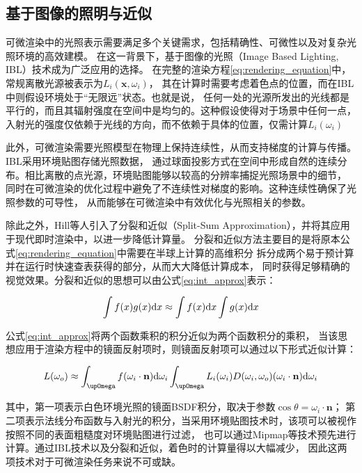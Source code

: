 \subsection{基于图像的照明与近似}
可微渲染中的光照表示需要满足多个关键需求，包括精确性、可微性以及对复杂光照环境的高效建模。
在这一背景下，基于图像的光照（Image Based Lighting, IBL）技术成为广泛应用的选择。
在完整的渲染方程\eqref{eq:rendering_equation}中，常规离散光源被表示为$L_i(\mathbf{x},\omega_i)$，
其在计算时需要考虑着色点的位置，而在IBL中则假设环境处于“无限远”状态。也就是说，
任何一处的光源所发出的光线都是平行的，而且其辐射强度在空间中是均匀的。这种假设使得对于场景中任何一点，
入射光的强度仅依赖于光线的方向，而不依赖于具体的位置，仅需计算$L_i(\omega_i)$

此外，可微渲染需要光照模型在物理上保持连续性，从而支持梯度的计算与传播。IBL采用环境贴图存储光照数据，
通过球面投影方式在空间中形成自然的连续分布。相比离散的点光源，环境贴图能够以较高的分辨率捕捉光照场景中的细节，
同时在可微渲染的优化过程中避免了不连续性对梯度的影响。这种连续性确保了光照参数的可导性，
从而能够在可微渲染中有效优化与光照相关的参数。

除此之外，Hill等人\cite{Hill_2014}引入了分裂和近似（Split-Sum Approximation），并将其应用于现代即时渲染中，以进一步降低计算量。
分裂和近似方法主要目的是将原本公式\eqref{eq:rendering_equation}中需要在半球上计算的高维积分
拆分成两个易于预计算并在运行时快速查表获得的部分，从而大大降低计算成本，
同时获得足够精确的视觉效果。分裂和近似的思想可以由公式\eqref{eq:int_approx}表示：

\begin{equation}
  \int f(x)g(x){\rm{d}}x\approx \int{f(x){\rm{d}}x} \int{g(x){\rm{d}}x}
  \label{eq:int_approx}
\end{equation}

公式\eqref{eq:int_approx}将两个函数乘积的积分近似为两个函数积分的乘积，
当该思想应用于渲染方程中的镜面反射项时，则镜面反射项可以通过以下形式近似计算：

\begin{equation}
  L(\omega_o)\approx 
  \int_{\upOmega}{f(\omega_i\cdot{\bf{n}}){\rm{d}}\omega_i}
  \int_{\upOmega}{L_i(\omega_i)D(\omega_i,\omega_o)(\omega_i\cdot{\bf{n}}){\rm{d}}\omega_i}
  \label{eq:L_omega_o_approx}
\end{equation}

其中，第一项表示白色环境光照的镜面BSDF积分，取决于参数$\cos{\theta}=\omega_i\cdot{\mathbf{n}}；$
第二项表示法线分布函数与入射光的积分，当采用环境贴图技术时，该项可以被视作按照不同的表面粗糙度对环境贴图进行过滤，
也可以通过Mipmap等技术预先进行计算。通过IBL技术以及分裂和近似，着色时的计算量得以大幅减少，
因此这两项技术对于可微渲染任务来说不可或缺。

